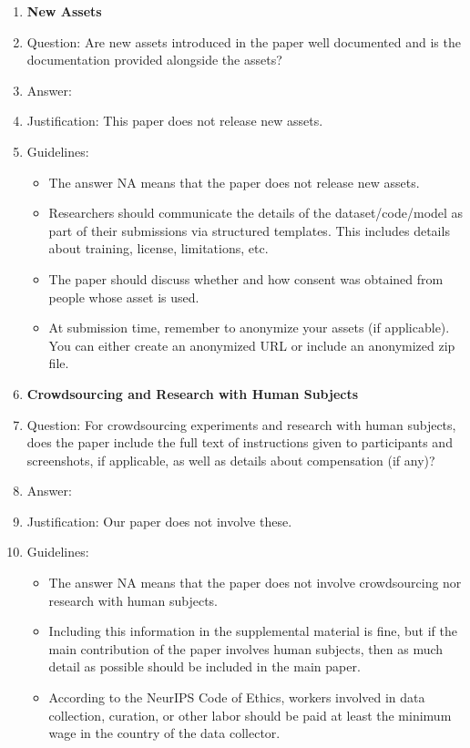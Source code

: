 \documentclass{article}
\begin{document}
\begin{enumerate}
\item {\bf New Assets}
    \item[] Question: Are new assets introduced in the paper well documented and is the documentation provided alongside the assets?
    \item[] Answer:  \answerNA{} %
    \item[] Justification: This paper does not release new assets.
    \item[] Guidelines:
    \begin{itemize}
        \item The answer NA means that the paper does not release new assets.
        \item Researchers should communicate the details of the dataset/code/model as part of their submissions via structured templates. This includes details about training, license, limitations, etc. 
        \item The paper should discuss whether and how consent was obtained from people whose asset is used.
        \item At submission time, remember to anonymize your assets (if applicable). You can either create an anonymized URL or include an anonymized zip file.
    \end{itemize}

\item {\bf Crowdsourcing and Research with Human Subjects}
    \item[] Question: For crowdsourcing experiments and research with human subjects, does the paper include the full text of instructions given to participants and screenshots, if applicable, as well as details about compensation (if any)? 
    \item[] Answer: \answerNA{} %
    \item[] Justification: Our paper does not involve these.
    \item[] Guidelines:
    \begin{itemize}
        \item The answer NA means that the paper does not involve crowdsourcing nor research with human subjects.
        \item Including this information in the supplemental material is fine, but if the main contribution of the paper involves human subjects, then as much detail as possible should be included in the main paper. 
        \item According to the NeurIPS Code of Ethics, workers involved in data collection, curation, or other labor should be paid at least the minimum wage in the country of the data collector. 
    \end{itemize}


\end{enumerate}
\end{document}
